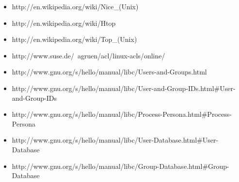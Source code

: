 \documentclass[a4paper,10pt]{article}
\begin{document}
\begin{itemize}
  \item http://en.wikipedia.org/wiki/Nice\_(Unix)
  \item http://en.wikipedia.org/wiki/Htop
  \item http://en.wikipedia.org/wiki/Top\_(Unix)
  \item http://www.suse.de/~agruen/acl/linux-acls/online/
  \item http://www.gnu.org/s/hello/manual/libc/Users-and-Groups.html
  \item http://www.gnu.org/s/hello/manual/libc/User-and-Group-IDs.html\#User-and-Group-IDs
  \item http://www.gnu.org/s/hello/manual/libc/Process-Persona.html\#Process-Persona
  \item http://www.gnu.org/s/hello/manual/libc/User-Database.html\#User-Database
  \item http://www.gnu.org/s/hello/manual/libc/Group-Database.html\#Group-Database
\end{itemize}
   
\end{document}
